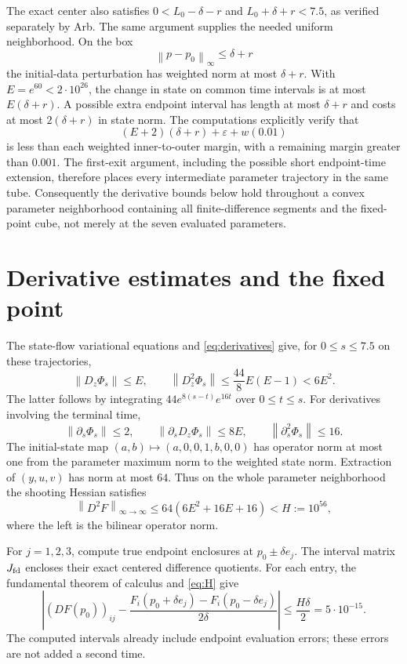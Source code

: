 \documentclass[11pt]{article}
\newcommand{\norm}[1]{\left\lVert#1\right\rVert}
\begin{document}
The exact center also satisfies $0<L_0-\delta-r$ and
$L_0+\delta+r<7.5$, as verified separately by Arb.
The same argument supplies the needed uniform neighborhood. On the box
\[
 \norm{p-p_0}_\infty\le\delta+r
\]
the initial-data perturbation has weighted norm at most $\delta+r$.
With $E=e^{60}<2\cdot10^{26}$, the change in state on common time
intervals is at most $E(\delta+r)$. A possible extra endpoint interval
has length at most $\delta+r$ and costs at most $2(\delta+r)$ in state
norm. The computations explicitly verify that
\[
 (E+2)(\delta+r)+\varepsilon+w(0.01)
\]
is less than each weighted inner-to-outer margin, with a remaining margin
greater than $0.001$. The first-exit argument, including the possible
short endpoint-time extension, therefore places every intermediate
parameter trajectory in the same tube. Consequently the derivative bounds
below hold throughout a convex parameter neighborhood containing all
finite-difference segments and the fixed-point cube, not merely at the
seven evaluated parameters.

\section{Derivative estimates and the fixed point}
The state-flow variational equations and \eqref{eq:derivatives} give, for
$0\le s\le7.5$ on these trajectories,
\[
 \norm{D_z\Phi_s}\le E,\qquad
 \norm{D_z^2\Phi_s}\le\frac{44}{8}E(E-1)<6E^2.
\]
The latter follows by integrating
$44e^{8(s-t)}e^{16t}$ over $0\le t\le s$.
For derivatives involving the terminal time,
\[
 \norm{\partial_s\Phi_s}\le2,\qquad
 \norm{\partial_sD_z\Phi_s}\le8E,
 \qquad \norm{\partial_s^2\Phi_s}\le16.
\]
The initial-state map $(a,b)\mapsto(a,0,0,1,b,0,0)$ has operator norm at
most one from the parameter maximum norm to the weighted state norm.
Extraction of $(y,u,v)$ has norm at most $64$. Thus on the whole parameter
neighborhood the shooting Hessian satisfies
\begin{equation}\label{eq:H}
 \norm{D^2F}_{\infty\to\infty}
 \le64(6E^2+16E+16)<H:=10^{56},
\end{equation}
where the left is the bilinear operator norm.

For $j=1,2,3$, compute true endpoint enclosures at $p_0\pm\delta e_j$.
The interval matrix $J_{\rm fd}$ encloses their exact centered difference
quotients. For each entry, the fundamental theorem of calculus and
\eqref{eq:H} give
\begin{equation}\label{eq:FD}
 \left|(DF(p_0))_{ij}
 -\frac{F_i(p_0+\delta e_j)-F_i(p_0-\delta e_j)}{2\delta}\right|
 \le\frac{H\delta}{2}=5\cdot10^{-15}.
\end{equation}
The computed intervals already include endpoint evaluation errors;
these errors are not added a second time.
\end{document}
